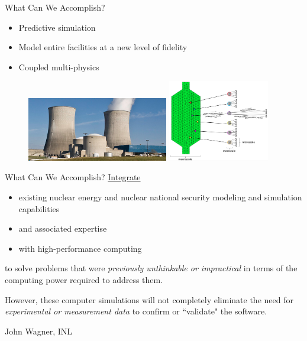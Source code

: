 \documentclass[xcolor=x11names,compress, handout]{beamer}
\renewcommand{\(}{\begin{columns}}
\renewcommand{\)}{\end{columns}}
\newcommand{\<}[1]{\begin{column}{#1}}
\renewcommand{\>}{\end{column}}
\begin{document}
\begin{frame}{What Can We Accomplish?}
\begin{itemize}
\item Predictive simulation 
\item Model entire facilities at a new level of fidelity
\item Coupled multi-physics
\end{itemize}
\begin{figure}
\includegraphics[height=1.1in,clip]{../figs/WattsBar}
\hspace*{1em}
\includegraphics[height=1.4in,clip]{../figs/multiscale_pbr_d}
\end{figure}
\end{frame}

\begin{frame}{What Can We Accomplish?}
\underline{Integrate}
\begin{itemize}
\item existing nuclear energy and nuclear national security modeling and simulation capabilities
\item and associated expertise
\item with high-performance computing
\end{itemize}    
to solve problems that were \emph{previously unthinkable or impractical} in terms of the computing power required to address them.

\vspace*{1em}
However, these computer simulations will not completely eliminate the need for \emph{experimental or measurement data} to confirm or ``validate" the software. 

\vspace*{1em}
\hspace*{0.25 in} John Wagner, INL
\end{frame}
\end{document}
